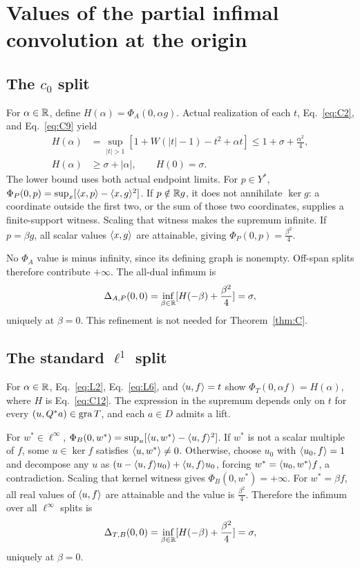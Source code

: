 \appendix
\section{Values of the partial infimal convolution at the origin}
\label{sec:split}
\subsection{The $c_0$ split}
\label{sec:C7}
For $\alpha\in\mathbb R$, define $H(\alpha)=\Phi_A(0,\alpha g)$.
Actual realization of each $t$, Eq.~\eqref{eq:C2}, and
Eq.~\eqref{eq:C9} yield
\begin{equation}
\begin{aligned}
H(\alpha)&=\sup_{|t|>1}[1+W(|t|-1)-t^2+\alpha t]
 \le1+\sigma+\frac{\alpha^2}{4},\\
H(\alpha)&\ge\sigma+|\alpha|,\qquad H(0)=\sigma.
\end{aligned}
\tag{C12}\label{eq:C12}
\end{equation}
The lower bound uses both actual endpoint limits. For $p\in Y^*$,
$\Phi_P(0,p)=\sup_x[\langle x,p\rangle-\langle x,g\rangle^2]$.
If $p\notin\mathbb R g$, it does not annihilate $\ker g$: a coordinate outside
the first two, or the sum of those two coordinates, supplies a
finite-support witness. Scaling that witness makes the supremum infinite.
If $p=\beta g$, all scalar values $\langle x,g\rangle$ are attainable, giving
$\Phi_P(0,p)=\frac{\beta^2}{4}$.

No $\Phi_A$ value is minus infinity, since its defining graph is nonempty.
Off-span splits therefore contribute $+\infty$. The all-dual infimum is
\[
\Delta_{A,P}(0,0)=\inf_{\beta\in\mathbb R}[H(-\beta)+\frac{\beta^2}{4}]=\sigma,
\]
uniquely at $\beta=0$. This refinement is not needed for
Theorem~\ref{thm:C}.

\subsection{The standard $\ell^1$ split}
\label{sec:L6}
For $\alpha\in\mathbb R$, Eq.~\eqref{eq:L2}, Eq.~\eqref{eq:L6}, and
$\langle u,f\rangle=t$ show $\Phi_T(0,\alpha f)=H(\alpha)$, where $H$ is
Eq.~\eqref{eq:C12}. The expression in the supremum depends only on
$t$ for every $(u,Q^*a)\in\operatorname{gra} T$, and each $a\in D$ admits a lift.

For $w^*\in\ell^\infty$,
$\Phi_B(0,w^*)=\sup_u[\langle u,w^*\rangle-\langle u,f\rangle^2]$.
If $w^*$ is not a scalar multiple of $f$, some $u\in\ker f$ satisfies
$\langle u,w^*\rangle\ne0$. Otherwise, choose $u_0$ with $\langle u_0,f\rangle=1$ and
decompose any $u$ as $(u-\langle u,f\rangle u_0)+\langle u,f\rangle u_0$, forcing
$w^*=\langle u_0,w^*\rangle f$, a contradiction.
Scaling that kernel witness gives $\Phi_B(0,w^*)=+\infty$.
For $w^*=\beta f$, all real values of $\langle u,f\rangle$ are attainable and
the value is $\frac{\beta^2}{4}$. Therefore the infimum over all $\ell^\infty$
splits is
\[
\Delta_{T,B}(0,0)=\inf_{\beta\in\mathbb R}[H(-\beta)+\frac{\beta^2}{4}]=\sigma,
\]
uniquely at $\beta=0$.


